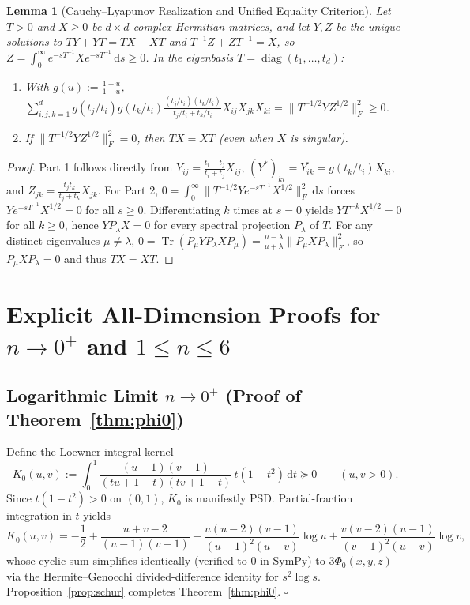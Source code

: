 \documentclass[11pt,a4paper]{article}
\newtheorem{lemma}[theorem]{Lemma}
\theoremstyle{remark}
\newcommand{\Tr}{\operatorname{Tr}}
\begin{document}
\begin{lemma}[Cauchy--Lyapunov Realization and Unified Equality Criterion]\label{lem:lyap}
Let $T>0$ and $X\ge 0$ be $d\times d$ complex Hermitian matrices, and let $Y,Z$ be the unique solutions to $TY+YT = TX-XT$ and $T^{-1}Z+ZT^{-1} = X$, so $Z = \int_0^\infty e^{-s T^{-1}} X e^{-s T^{-1}}\,\mathrm{d}s \ge 0$. In the eigenbasis $T=\operatorname{diag}(t_1,\dots,t_d)$:
\begin{enumerate}
  \item With $g(u):=\frac{1-u}{1+u}$, $\sum_{i,j,k=1}^d g(t_j/t_i)g(t_k/t_i)\frac{(t_j/t_i)(t_k/t_i)}{t_j/t_i+t_k/t_i} X_{ij}X_{jk}X_{ki} = \|T^{-1/2}YZ^{1/2}\|_F^2 \ge 0$.
  \item If $\|T^{-1/2}YZ^{1/2}\|_F^2 = 0$, then $TX = XT$ (even when $X$ is singular).
\end{enumerate}
\end{lemma}

\begin{proof}
Part 1 follows directly from $Y_{ij}=\frac{t_i-t_j}{t_i+t_j}X_{ij}$, $(Y^*)_{ki}=\overline{Y_{ik}}=g(t_k/t_i)X_{ki}$, and $Z_{jk}=\frac{t_jt_k}{t_j+t_k}X_{jk}$. For Part 2, $0 = \int_0^\infty \|T^{-1/2}Ye^{-sT^{-1}}X^{1/2}\|_F^2\,\mathrm{d}s$ forces $Ye^{-sT^{-1}}X^{1/2}=0$ for all $s\ge 0$. Differentiating $k$ times at $s=0$ yields $YT^{-k}X^{1/2}=0$ for all $k\ge 0$, hence $Y P_\lambda X = 0$ for every spectral projection $P_\lambda$ of $T$. For any distinct eigenvalues $\mu\ne\lambda$, $0 = \Tr(P_\mu Y P_\lambda X P_\mu) = \frac{\mu-\lambda}{\mu+\lambda}\|P_\mu X P_\lambda\|_F^2$, so $P_\mu X P_\lambda=0$ and thus $TX=XT$.
\end{proof}

\section{Explicit All-Dimension Proofs for $n\to 0^+$ and $1\le n\le 6$}

\subsection{Logarithmic Limit $n\to 0^+$ (Proof of Theorem~\ref{thm:phi0})}
Define the Loewner integral kernel
\[
K_0(u,v) := \int_0^1 \frac{(u-1)(v-1)}{(tu+1-t)(tv+1-t)}\,t(1-t^2)\,\mathrm{d}t \succeq 0 \qquad (u,v>0).
\]
Since $t(1-t^2)>0$ on $(0,1)$, $K_0$ is manifestly PSD. Partial-fraction integration in $t$ yields
\[
K_0(u,v) = -\frac{1}{2} + \frac{u+v-2}{(u-1)(v-1)} - \frac{u(u-2)(v-1)}{(u-1)^2(u-v)}\log u + \frac{v(v-2)(u-1)}{(v-1)^2(u-v)}\log v,
\]
whose cyclic sum simplifies identically (verified to $0$ in SymPy) to $3\Phi_0(x,y,z)$ via the Hermite--Genocchi divided-difference identity for $s^2\log s$. Proposition~\ref{prop:schur} completes Theorem~\ref{thm:phi0}. $\square$
\end{document}
